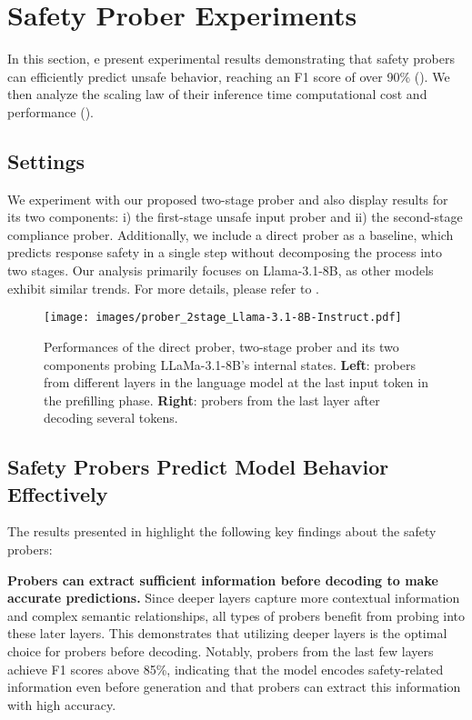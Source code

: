 \section{Safety Prober Experiments}
In this section, e present experimental results demonstrating that safety probers can efficiently predict unsafe behavior, reaching an F1 score of over 90\% (). We then analyze the scaling law of their inference time computational cost and performance ().

\subsection{Settings}
We experiment with our proposed two-stage prober and also display results for its two components: i) the first-stage unsafe input prober and ii) the second-stage compliance prober. Additionally, we include a direct prober as a baseline, which predicts response safety in a single step without decomposing the process into two stages.
Our analysis primarily focuses on Llama-3.1-8B, as other models exhibit similar trends. For more details, please refer to .

\begin{figure}[htbp]
    \centering
    \texttt{[image: images/prober\_2stage\_Llama-3.1-8B-Instruct.pdf]}
    \caption{Performances of the direct prober, two-stage prober and its two components probing LLaMa-3.1-8B's internal states. \textbf{Left}: probers from different layers in the language model at the last input token in the prefilling phase. \textbf{Right}: probers from the last layer after decoding several tokens.}
    \label{fig:prober}
\end{figure}

\subsection{Safety Probers Predict Model Behavior Effectively}
\label{sec:prober_results}

The results presented in  highlight the following key findings about the safety probers:

\textbf{Probers can extract sufficient information before decoding to make accurate predictions.} Since deeper layers capture more contextual information and complex semantic relationships, all types of probers benefit from probing into these later layers. This demonstrates that utilizing deeper layers is the optimal choice for probers before decoding. Notably, probers from the last few layers achieve F1 scores above 85\%, indicating that the model encodes safety-related information even before generation and that probers can extract this information with high accuracy.


